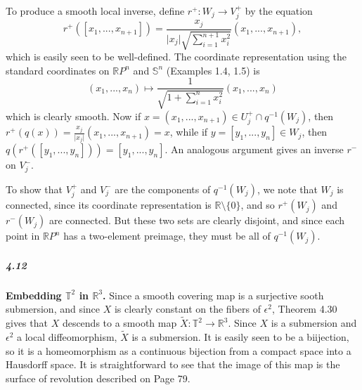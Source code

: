 \documentclass[10pt,letter]{article}
\begin{document}
To produce a smooth local inverse, define $r^+: W_j \rightarrow V_j^+$ by the equation
\[
r^+([x_1,...,x_{n+1}]) = \frac{x_j}{\vert x_{j} \vert \sqrt{\sum_{i=1}^{n+1} x_i^2}}(x_1,...,x_{n+1}),
\]
which is easily seen to be well-defined. The coordinate representation using the standard coordinates on $\mathbb{R}P^n$ and $\mathbb{S}^n$ (Examples 1.4, 1.5) is
\[
(x_1,...,x_n) \mapsto \frac{1}{\sqrt{1+\sum_{i=1}^{n} x_i^2}}(x_1,...,x_{n})
\]
which is clearly smooth. Now if $x = (x_1,...,x_{n+1}) \in U_j^+ \cap q^{-1}(W_j)$, then $r^+(q(x)) = \frac{x_j}{\vert x_j \vert}(x_1,...,x_{n+1}) = x$, while if $y = [y_1,...,y_n] \in W_j$, then $q(r^+([y_1,...,y_n])) = [y_1,...,y_n]$. An analogous argument gives an inverse $r^-$ on $V_j^-$.

To show that $V_j^+$ and $V_j^-$ are the components of $q^{-1}(W_j)$, we note that $W_j$ is connected, since its coordinate representation is $\mathbb{R} \setminus \lbrace 0 \rbrace$, and so $r^+(W_j)$ and $r^-(W_j)$ are connected. But these two sets are clearly disjoint, and since each point in $\mathbb{R}P^n$ has a two-element preimage, they must be all of $q^{-1}(W_j)$. 

\subparagraph{4.12} {\bf Embedding $\mathbb{T}^2$ in $\mathbb{R}^3$.} Since a smooth covering map is a surjective sooth submersion, and since $X$ is clearly constant on the fibers of $\epsilon^2$, Theorem 4.30 gives that $X$ descends to a smooth map $\tilde{X}: \mathbb{T}^2 \rightarrow \mathbb{R}^3$. Since $X$ is a submersion and $\epsilon^2$ a local diffeomorphism, $\tilde{X}$ is a submersion. It is easily seen to be a biijection, so it is a homeomorphism as a continuous bijection from a compact space into a Hausdorff space. It is straightforward to see that the image of this map is the surface of revolution described on Page 79. 
\end{document}
